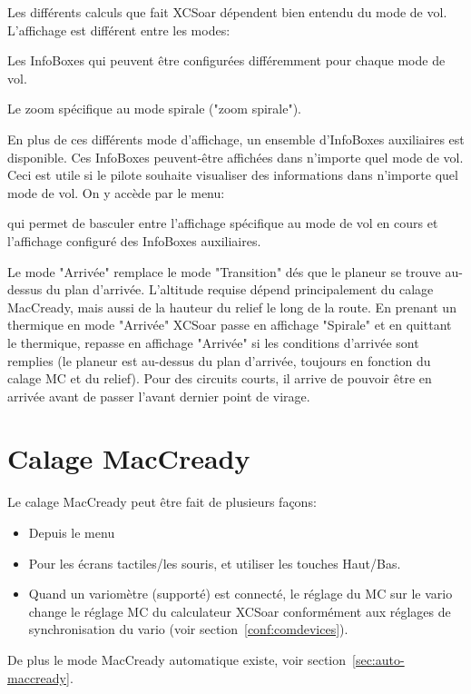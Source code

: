 Les différents calculs que fait XCSoar dépendent bien entendu du mode de vol. L'affichage est différent entre les modes:
\begin{description}
\item Les InfoBoxes  qui peuvent être configurées différemment pour chaque mode de vol.
\item Le zoom spécifique au mode spirale ("zoom spirale").
\end{description}

En plus de ces différents mode d'affichage, un ensemble d'InfoBoxes auxiliaires est disponible. Ces InfoBoxes peuvent-être affichées dans n'importe quel mode de vol. Ceci est utile si le pilote souhaite visualiser des informations dans n'importe quel mode de vol. On y accède par le menu:
\begin{quote}
\blink{}
\end{quote}

qui permet de basculer entre l'affichage spécifique au mode de vol en cours et l'affichage configuré des InfoBoxes auxiliaires.

Le mode "Arrivée" remplace le mode "Transition" dés que le planeur se trouve au-dessus du plan d'arrivée. L'altitude requise dépend principalement du calage MacCready, mais aussi de la hauteur du relief le long de la route. En prenant un thermique en mode "Arrivée"  XCSoar passe en affichage "Spirale" et en quittant le thermique, repasse en affichage "Arrivée" si les conditions d'arrivée sont remplies (le planeur est au-dessus du plan d'arrivée, toujours en fonction du calage MC et du relief). Pour des circuits courts, il arrive de pouvoir être en arrivée avant de passer l'avant dernier point de virage.

\section{Calage MacCready}

Le calage MacCready peut être fait de plusieurs façons:
\begin{itemize}
\item Depuis le menu
\begin{quote}
\blink{}
\end{quote}

\item Pour les écrans tactiles/les souris, et utiliser les touches Haut/Bas.
\item Quand un variomètre (supporté) est connecté, le réglage du MC sur le vario change le réglage MC du calculateur XCSoar conformément aux réglages de synchronisation du vario (voir 
  section~\ref{conf:comdevices}).
\end{itemize}
De plus le mode MacCready automatique existe, voir section~\ref{sec:auto-maccready}.

